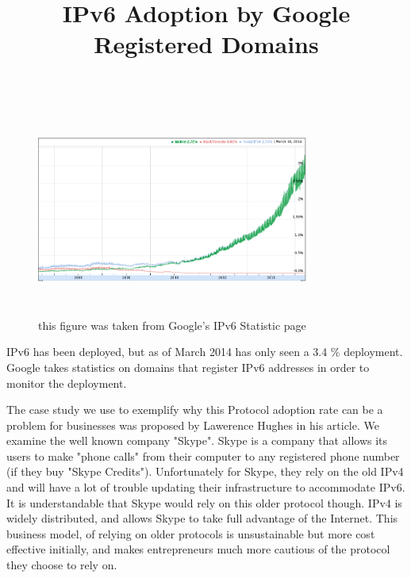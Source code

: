\begin{figure}[h!]
	\centering
	\title{IPv6 Adoption by Google Registered Domains}
	\includegraphics[width = 0.8\textwidth, height = 7cm]{Figures/IPv6Adoption.jpeg}
	\caption{this figure was taken from Google's IPv6 Statistic page\cite{goog}}
\end{figure}

IPv6 has been deployed, but as of March 2014 has only seen a 3.4 \% deployment.\cite{goog} Google takes statistics on domains that register IPv6 addresses in order to monitor the deployment.


The case study we use to exemplify why this Protocol adoption rate can be a problem for businesses was proposed by Lawerence Hughes in his article\cite{sxsc}. We examine the well known company "Skype". Skype is a company that allows its users to make "phone calls" from their computer to any registered phone number (if they buy "Skype Credits"). Unfortunately for Skype, they rely on the old IPv4 and will have a lot of trouble updating their infrastructure to accommodate IPv6. It is understandable that Skype would rely on this older protocol though. IPv4 is widely distributed, and allows Skype to take full advantage of the Internet. This business model, of relying on older protocols is unsustainable but more cost effective initially, and makes entrepreneurs much more cautious of the protocol they choose to rely on. 







   